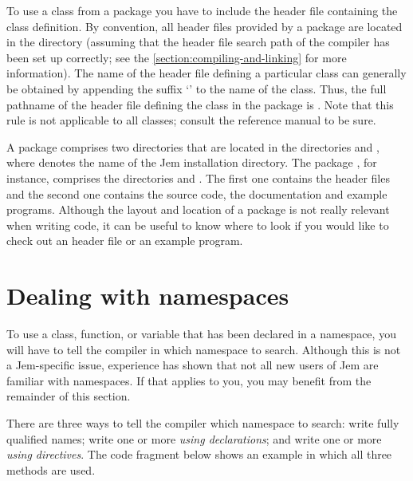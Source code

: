 \documentclass[a4paper,10pt]{article}
\begin{document}
To use a class from a package you have to include the header file
containing the class definition. By convention, all header files
provided by a package are located in the directory
\- (assuming that the header file
search path of the compiler has been set up correctly; see the
\autoref{section:compiling-and-linking} for more information). The
name of the header file defining a particular class can generally be
obtained by appending the suffix `' to the name of the class.
Thus, the full pathname of the header file defining the class
 in the package  is
. Note that this rule is not
applicable to all classes; consult the reference manual to be sure.

A package comprises two directories that are located in the directories
 and , where
 denotes the name of the Jem installation directory. The
package , for instance, comprises the directories
 and .
The first one contains the header files and the second one contains the
source code, the documentation and example programs. Although the layout
and location of a package is not really relevant when writing code, it
can be useful to know where to look if you would like to check out an
header file or an example program.


\section{Dealing with namespaces \label{section:namespaces}}

To use a class, function, or variable that has been declared in a
namespace, you will have to tell the compiler in which namespace to
search. Although this is not a Jem-specific issue, experience has shown
that not all new users of Jem are familiar with namespaces. If that
applies to you, you may benefit from the remainder of this section.

There are three ways to tell the compiler which namespace to search:
write fully qualified names; write one or more \emph{using declarations};
and write one or more \emph{using directives}. The code fragment below
shows an example in which all three methods are used.

\end{document}
